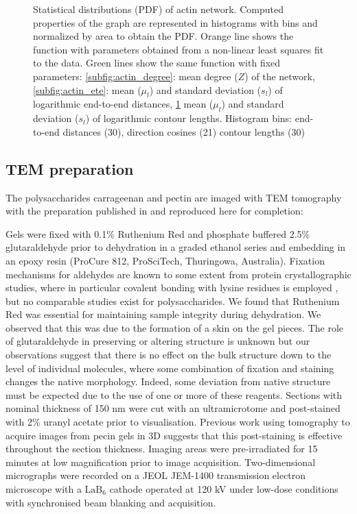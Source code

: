 \begin{figure}[H]
\begin{subfigure}{0.5\textwidth}
    \label{subfig:actin_contour}
  \end{subfigure}
  \caption{Statistical distributions (PDF) of actin network. Computed properties of the graph are represented in histograms with bins and normalized by area to obtain the PDF. Orange line shows the function with parameters obtained from a non-linear least squares fit to the data.
    Green lines show the same function with fixed parameters: \ref{subfig:actin_degree}: mean degree ($Z$) of the network, \ref{subfig:actin_ete}: mean ($\mu_l$) and standard deviation ($s_l$) of logarithmic end-to-end distances,
  \ref{subfig:actin_contour} mean ($\mu_l$) and standard deviation ($s_l$) of logarithmic contour lengths.
Histogram bins: end-to-end distances (30), direction cosines (21) contour lengths (30) }
  \label{fig:actin_thin}
\end{figure}

\subsection{TEM preparation}%
\label{sub:tem_preparation}

The polysaccharides carrageenan and pectin are imaged with \gls{TEM} tomography with the preparation published in \citep{hernandez-cerdan_structural_2018-2} and reproduced here for completion:

Gels were fixed with 0.1\% Ruthenium Red and phosphate buffered 2.5\% glutaraldehyde prior to dehydration in a graded ethanol series and embedding in an epoxy resin (ProCure 812, ProSciTech, Thuringowa, Australia). Fixation mechanisms for aldehydes are known to some extent from protein crystallographic studies, where in particular covalent bonding with lysine residues is employed \cite{wine_elucidation_2007}, but no comparable studies exist for polysaccharides. We found that Ruthenium Red was essential for maintaining sample integrity during dehydration. We observed that this was due to the formation of a skin on the gel pieces. The role of glutaraldehyde in preserving or altering structure is unknown but our observations suggest that there is no effect on the bulk structure down to the level of individual molecules, where some combination of fixation and staining changes the native morphology. Indeed, some deviation from native structure must be expected due to the use of one or more of these reagents. Sections with nominal thickness of 150 nm were cut with an ultramicrotome and post-stained with 2\% uranyl acetate prior to visualisation. Previous work using tomography to acquire images from pecin gels in 3D \cite{mansel_zooming_2015} suggests that this post-staining is effective throughout the section thickness. Imaging areas were pre-irradiated for 15 minutes at low magnification prior to image acquisition. Two-dimensional micrographs were recorded on a JEOL JEM-1400 transmission electron microscope with a $\text{LaB}_6$ cathode operated at 120 kV under low-dose conditions with synchronised beam blanking and acquisition.

